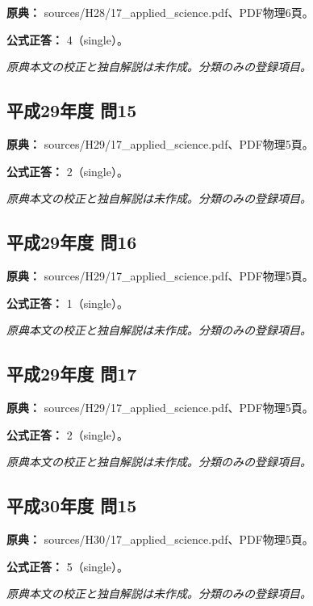 \noindent\textbf{原典：} sources/H28/17\_applied\_science.pdf、PDF物理6頁。

\textbf{公式正答：} 4（single）。

\par\textit{原典本文の校正と独自解説は未作成。分類のみの登録項目。}

\subsection{平成29年度 問15}
\label{q:h29-reg-applied-15}

\noindent\textbf{原典：} sources/H29/17\_applied\_science.pdf、PDF物理5頁。

\textbf{公式正答：} 2（single）。

\par\textit{原典本文の校正と独自解説は未作成。分類のみの登録項目。}

\subsection{平成29年度 問16}
\label{q:h29-reg-applied-16}

\noindent\textbf{原典：} sources/H29/17\_applied\_science.pdf、PDF物理5頁。

\textbf{公式正答：} 1（single）。

\par\textit{原典本文の校正と独自解説は未作成。分類のみの登録項目。}

\subsection{平成29年度 問17}
\label{q:h29-reg-applied-17}

\noindent\textbf{原典：} sources/H29/17\_applied\_science.pdf、PDF物理5頁。

\textbf{公式正答：} 2（single）。

\par\textit{原典本文の校正と独自解説は未作成。分類のみの登録項目。}

\subsection{平成30年度 問15}
\label{q:h30-reg-applied-15}

\noindent\textbf{原典：} sources/H30/17\_applied\_science.pdf、PDF物理5頁。

\textbf{公式正答：} 5（single）。

\par\textit{原典本文の校正と独自解説は未作成。分類のみの登録項目。}

